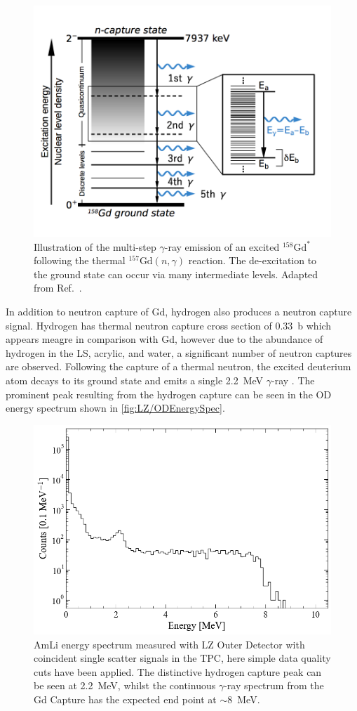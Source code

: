 \begin{figure}[!ht]
    \centering
    \includegraphics[width=0.7\linewidth]{figures/LZ/ContinuumEmission2.png}
    \caption{Illustration of the multi-step $\gamma$-ray emission of an excited $^{158}\text{Gd}^*$ following the thermal $^{157}\text{Gd}(n,\gamma)$ reaction. The de-excitation to the ground state can occur via many intermediate levels. Adapted from Ref.~\cite{Hagiwara:2018kmr}.}
    \label{fig:LZ/Gd158Deexcite}
\end{figure}
In addition to neutron capture of Gd, hydrogen also produces a neutron capture signal. Hydrogen has thermal neutron capture cross section of 0.33~b which appears meagre in comparison with Gd, however due to the abundance of hydrogen in the LS, acrylic, and water, a significant number of neutron captures are observed. Following the capture of a thermal neutron, the excited deuterium atom decays to its ground state and emits a single 2.2~MeV $\gamma$-ray \cite{LZTDR}. The prominent peak resulting from the hydrogen capture can be seen in the OD energy spectrum shown in \autoref{fig:LZ/ODEnergySpec}.
\begin{figure}[!ht]
    \centering
    \includegraphics[width=0.7\linewidth]{figures/LZ/ODEnergySpec.png}
    \caption{AmLi energy spectrum measured with LZ Outer Detector with coincident single scatter signals in the TPC, here simple data quality cuts have been applied. The distinctive hydrogen capture peak can be seen at 2.2~MeV, whilst the continuous $\gamma$-ray spectrum from the Gd Capture has the expected end point at $\mathtt{\sim}$8~MeV.}
    \label{fig:LZ/ODEnergySpec}
\end{figure}
